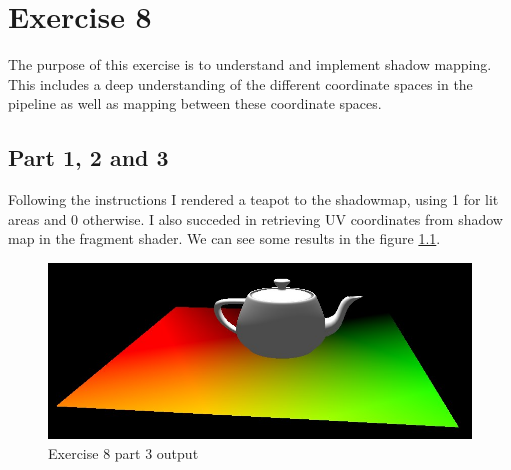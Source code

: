 \chapter{Exercise 8}
The purpose of this exercise is to understand and implement shadow mapping. 
This includes a deep understanding of the different coordinate spaces in the 
pipeline as well as mapping between these coordinate spaces. 

\section{Part 1, 2 and 3}
Following the instructions I rendered a teapot to the shadowmap, using 1 for lit areas
and 0 otherwise. I also succeded in retrieving UV coordinates from shadow map in the
fragment shader. We can see some results in the figure \ref{fig:exercise_8_1}.
\begin{figure}[ht!]
	\begin{center}
		\includegraphics[width=1.0\textwidth]{figures/exercise_8_1}
	\end{center}
	\vspace{-4.5ex}\caption{Exercise 8 part 3 output}
	\label{fig:exercise_8_1} 
\end{figure}

